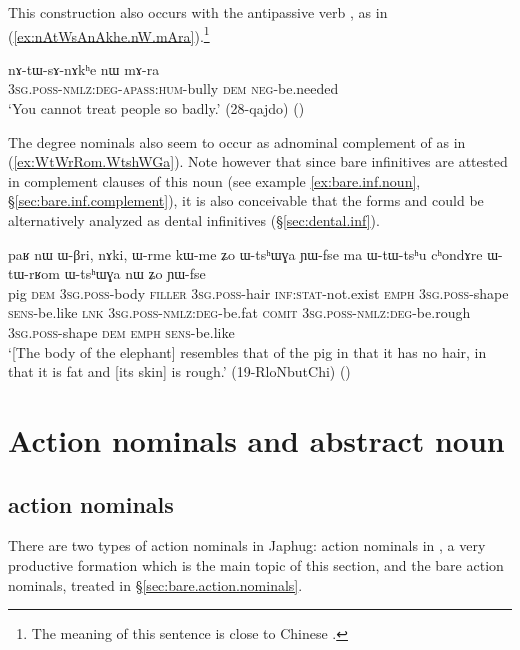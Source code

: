 This construction also occurs with the antipassive verb , as in (\ref{ex:nAtWsAnAkhe.nW.mAra}).\footnote{The meaning of this sentence is close to Chinese .
}

\begin{exe}
\ex \label{ex:nAtWsAnAkhe.nW.mAra}
\gll nɤ-tɯ-sɤ-nɤkʰe nɯ mɤ-ra \\
\textsc{3sg}.\textsc{poss}-\textsc{nmlz}:\textsc{deg}-\textsc{apass}:\textsc{hum}-bully \textsc{dem} \textsc{neg}-be.needed \\
\glt `You cannot treat people so badly.'  (28-qajdo) ()
\end{exe}

The degree nominals also seem to occur as adnominal complement of  as in (\ref{ex:WtWrRom.WtshWGa}). Note however that since bare infinitives are attested in complement clauses of this noun (see example \ref{ex:bare.inf.noun}, §\ref{sec:bare.inf.complement}), it is also conceivable that the forms  and  could be alternatively analyzed as dental infinitives (§\ref{sec:dental.inf}).

\begin{exe}
\ex \label{ex:WtWrRom.WtshWGa}
\gll  paʁ nɯ ɯ-βri, nɤki, ɯ-rme kɯ-me ʑo ɯ-tsʰɯɣa ɲɯ-fse ma ɯ-tɯ-tsʰu cʰondɤre ɯ-tɯ-rʁom ɯ-tsʰɯɣa nɯ ʑo ɲɯ-fse \\
pig \textsc{dem} \textsc{3sg}.\textsc{poss}-body \textsc{filler} \textsc{3sg}.\textsc{poss}-hair \textsc{inf}:\textsc{stat}-not.exist \textsc{emph} \textsc{3sg}.\textsc{poss}-shape \textsc{sens}-be.like \textsc{lnk} \textsc{3sg}.\textsc{poss}-\textsc{nmlz}:\textsc{deg}-be.fat \textsc{comit} \textsc{3sg}.\textsc{poss}-\textsc{nmlz}:\textsc{deg}-be.rough \textsc{3sg}.\textsc{poss}-shape \textsc{dem} \textsc{emph} \textsc{sens}-be.like \\
\glt `[The body of the elephant] resembles that of the pig in that it has no hair, in that it is fat and [its skin] is rough.' (19-RloNbutChi)
()
\end{exe}

\section{Action nominals and abstract noun} \label{sec:action.nominals}

\subsection{ action nominals} \label{sec:tW.action.nominal}
There are two types of action nominals in Japhug: action nominals in , a very productive formation which is the main topic of this section, and the bare action nominals, treated in §\ref{sec:bare.action.nominals}.

